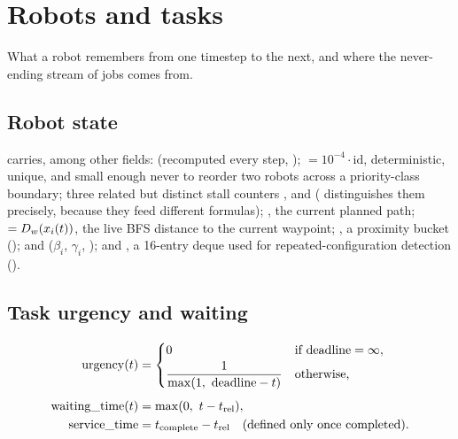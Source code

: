 \section{Robots and tasks}
\label{sec:robots-tasks}

\begin{lede}
What a robot remembers from one timestep to the next, and where the
never-ending stream of jobs comes from.
\end{lede}

\subsection{Robot state}

 carries, among other fields:  (recomputed every
step, );  $= 10^{-4} \cdot \mathrm{id}$,
deterministic, unique, and small enough never to reorder two robots across a
priority-class boundary; three related but distinct stall counters
,  and 
( distinguishes them precisely, because they feed
different formulas); , the current planned path;
 $= D_{w}(x_{i}(t))$, the live BFS
distance to the current waypoint; , a proximity bucket
();  and 
($\beta_i$, $\gamma_i$, ); and
, a 16-entry deque used for repeated-configuration
detection ().

\subsection{Task urgency and waiting}

\begin{align}
  \mathrm{urgency}(t) &=
    \begin{cases}
      0 & \text{if } \mathrm{deadline} = \infty,\\[2pt]
      \dfrac{1}{\max(1,\ \mathrm{deadline} - t)} & \text{otherwise,}
    \end{cases}\\[4pt]
  \mathrm{waiting\_time}(t) &= \max(0,\ t - t_{\mathrm{rel}}),\\
  \mathrm{service\_time} &= t_{\mathrm{complete}} - t_{\mathrm{rel}}
    \quad \text{(defined only once completed).}
\end{align}

